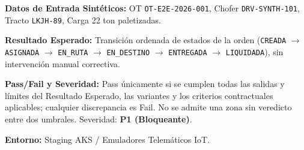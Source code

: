 \par\noindent\textbf{Datos de Entrada Sintéticos:} OT \texttt{O\allowbreak{}T\allowbreak{}-\allowbreak{}E\allowbreak{}2\allowbreak{}E\allowbreak{}-\allowbreak{}2\allowbreak{}0\allowbreak{}2\allowbreak{}6\allowbreak{}-\allowbreak{}0\allowbreak{}0\allowbreak{}1\allowbreak{}}, Chofer \texttt{D\allowbreak{}R\allowbreak{}V\allowbreak{}-\allowbreak{}S\allowbreak{}Y\allowbreak{}N\allowbreak{}T\allowbreak{}H\allowbreak{}-\allowbreak{}1\allowbreak{}0\allowbreak{}1\allowbreak{}}, Tracto \texttt{L\allowbreak{}K\allowbreak{}J\allowbreak{}H\allowbreak{}-\allowbreak{}8\allowbreak{}9\allowbreak{}}, Carga 22 ton paletizadas.\par
\par\noindent\textbf{Resultado Esperado:} Transición ordenada de estados de la orden (\texttt{C\allowbreak{}R\allowbreak{}E\allowbreak{}A\allowbreak{}D\allowbreak{}A\allowbreak{}} \(\rightarrow\) \texttt{A\allowbreak{}S\allowbreak{}I\allowbreak{}G\allowbreak{}N\allowbreak{}A\allowbreak{}D\allowbreak{}A\allowbreak{}} \(\rightarrow\) \texttt{E\allowbreak{}N\allowbreak{}\_\allowbreak{}R\allowbreak{}U\allowbreak{}T\allowbreak{}A\allowbreak{}} \(\rightarrow\) \texttt{E\allowbreak{}N\allowbreak{}\_\allowbreak{}D\allowbreak{}E\allowbreak{}S\allowbreak{}T\allowbreak{}I\allowbreak{}N\allowbreak{}O\allowbreak{}} \(\rightarrow\) \texttt{E\allowbreak{}N\allowbreak{}T\allowbreak{}R\allowbreak{}E\allowbreak{}G\allowbreak{}A\allowbreak{}D\allowbreak{}A\allowbreak{}} \(\rightarrow\) \texttt{L\allowbreak{}I\allowbreak{}Q\allowbreak{}U\allowbreak{}I\allowbreak{}D\allowbreak{}A\allowbreak{}D\allowbreak{}A\allowbreak{}}), sin intervención manual correctiva.\par
\par\noindent\textbf{Pass/Fail y Severidad:} Pass únicamente si se cumplen todas las salidas y límites del Resultado Esperado, las variantes y los criterios contractuales aplicables; cualquier discrepancia es Fail. No se admite una zona sin veredicto entre dos umbrales. Severidad: \textbf{P1 (Bloqueante)}.\par
\par\noindent\textbf{Entorno:} Staging AKS / Emuladores Telemáticos IoT.\par







